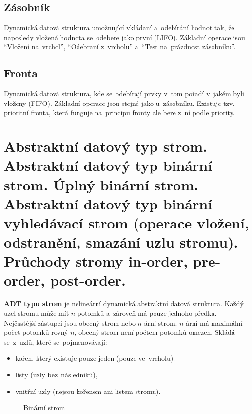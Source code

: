 \subsection{Zásobník}

Dynamická datová struktura umožnující vkládaní a~odebírání hodnot tak, že naposledy vložená hodnota se~odebere jako první (LIFO). Základní operace jsou \enquote{Vložení na~vrchol}, \enquote{Odebraní z~vrcholu} a~\enquote{Test na~prázdnost zásobníku}.

\subsection{Fronta}

Dynamická datová struktura, kde se~odebírají prvky v~tom pořadí v~jakém byli vloženy (FIFO). Základní operace jsou stejné jako u~zásobníku. Existuje tzv. prioritní fronta, která funguje na~principu fronty ale bere z~ní podle priority.

\clearpage
\section{Abstraktní datový typ strom. Abstraktní datový typ binární strom. Úplný binární strom. Abstraktní datový typ binární vyhledávací strom (operace vložení, odstranění, smazání uzlu stromu). Průchody stromy in-order, pre-order, post-order.}

\textbf{ADT typu strom} je nelineární dynamická abstraktní datová struktura. Každý uzel stromu může mít \( n \) potomků a~zároveň má pouze jednoho předka. Nejčastější zástupci jsou obecný strom nebo \( n \)-ární strom. \( n \)-ární má maximální počet potomků rovný \( n \), obecný strom není počtem potomků omezen. Skládá se~z~uzlů, které se~pojmenovávají:

\begin{itemize}
	\item kořen, který existuje pouze jeden (pouze ve~vrcholu),
	\item listy (uzly bez~následníků),
	\item vnitřní uzly (nejsou kořenem ani listem stromu).
\end{itemize}

\begin{figure}[ht]
	\centering
	\caption{Binární strom}
\end{figure}

